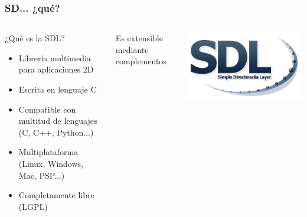 \begin{frame}
    \frametitle{SD... ¿qué?}
    
    
    \begin{columns}[c]
		\column{220pt}
		\begin{block}{¿Qué es la SDL?}
            \begin{itemize}
                \item Librería multimedia para aplicaciones 2D
                \item Escrita en lenguaje C
                \item Compatible con multitud de lenguajes (C, C++, Python...)
                \item Multiplataforma (Linux, Windows, Mac, PSP...)
                \item Completamente libre (LGPL)
            \end{itemize}            
        \end{block}
        
        \begin{center}
        Es extensible mediante complementos
        \end{center}
        
		\column{100pt}
		\begin{center}
			\includegraphics[scale=0.2]{img/sdl.jpeg}
		\end{center}
	\end{columns} 
\end{frame}

